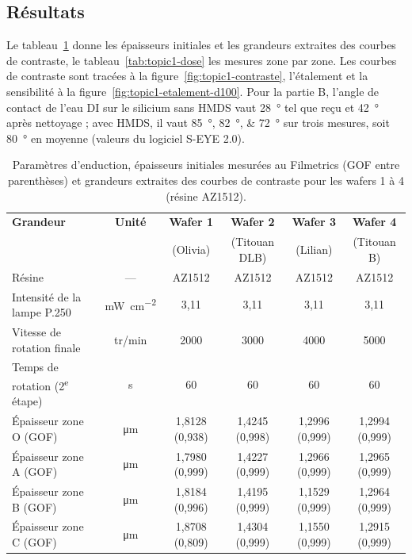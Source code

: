 \subsection{Résultats}
Le tableau~\ref{tab:topic1-epaisseurs} donne les épaisseurs initiales et les grandeurs extraites des courbes de contraste, le tableau~\ref{tab:topic1-dose} les mesures zone par zone. Les courbes de contraste sont tracées à la figure~\ref{fig:topic1-contraste}, l'étalement et la sensibilité à la figure~\ref{fig:topic1-etalement-d100}. Pour la partie B, l'angle de contact de l'eau DI sur le silicium sans HMDS vaut \qty{28}{\degree} tel que reçu et \qty{42}{\degree} après nettoyage ; avec HMDS, il vaut \qtylist{85;82;72}{\degree} sur trois mesures, soit \qty{80}{\degree} en moyenne (valeurs du logiciel S-EYE 2.0).

\begin{table}[H]
  \centering\footnotesize
  \setlength{\tabcolsep}{4pt}
  \caption{Paramètres d'enduction, épaisseurs initiales mesurées au Filmetrics (GOF entre parenthèses) et grandeurs extraites des courbes de contraste pour les wafers 1 à 4 (résine AZ1512).}
  \label{tab:topic1-epaisseurs}
  \begin{tabularx}{\linewidth}{@{}>{\raggedright\arraybackslash}X c c c c c@{}}
    \toprule
    \textbf{Grandeur} & \textbf{Unité} & \textbf{Wafer 1} & \textbf{Wafer 2} & \textbf{Wafer 3} & \textbf{Wafer 4} \\
    & & (Olivia) & (Titouan DLB) & (Lilian) & (Titouan B) \\
    \midrule
    Résine & --- & AZ1512 & AZ1512 & AZ1512 & AZ1512 \\
    Intensité de la lampe P.250 & \unit{\milli\watt\per\centi\metre\squared} & 3,11 & 3,11 & 3,11 & 3,11 \\
    Vitesse de rotation finale & tr/min & 2000 & 3000 & 4000 & 5000 \\
    Temps de rotation (2\textsuperscript{e} étape) & \unit{\second} & 60 & 60 & 60 & 60 \\
    \midrule
    Épaisseur zone O (GOF) & \unit{\micro\metre} & 1,8128 (0,938) & 1,4245 (0,998) & 1,2996 (0,999) & 1,2994 (0,999) \\
    Épaisseur zone A (GOF) & \unit{\micro\metre} & 1,7980 (0,999) & 1,4227 (0,999) & 1,2966 (0,999) & 1,2965 (0,999) \\
    Épaisseur zone B (GOF) & \unit{\micro\metre} & 1,8184 (0,996) & 1,4195 (0,999) & 1,1529 (0,999) & 1,2964 (0,999) \\
    Épaisseur zone C (GOF) & \unit{\micro\metre} & 1,8708 (0,809) & 1,4304 (0,999) & 1,1550 (0,999) & 1,2915 (0,999) \\

\end{tabularx}
\end{table}
